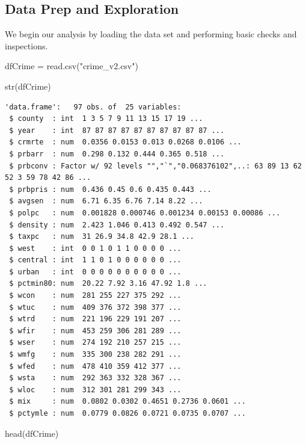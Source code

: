 \documentclass[]{article}
\newenvironment{Shaded}{}{}
\newcommand{\KeywordTok}[1]{\textcolor[rgb]{0.00,0.00,1.00}{#1}}
\newcommand{\NormalTok}[1]{#1}
\newcommand{\StringTok}[1]{\textcolor[rgb]{0.00,0.50,0.50}{#1}}
\begin{document}
\hypertarget{data-prep-and-exploration}{%
\subsection{Data Prep and Exploration}\label{data-prep-and-exploration}}

We begin our analysis by loading the data set and performing basic
checks and inspections.

\begin{Shaded}
\begin{Highlighting}[]
\NormalTok{dfCrime =}\StringTok{ }\KeywordTok{read.csv}\NormalTok{(}\StringTok{"crime_v2.csv"}\NormalTok{)}
\end{Highlighting}
\end{Shaded}

\begin{Shaded}
\begin{Highlighting}[]
\KeywordTok{str}\NormalTok{(dfCrime)}
\end{Highlighting}
\end{Shaded}

\begin{verbatim}
'data.frame':   97 obs. of  25 variables:
 $ county  : int  1 3 5 7 9 11 13 15 17 19 ...
 $ year    : int  87 87 87 87 87 87 87 87 87 87 ...
 $ crmrte  : num  0.0356 0.0153 0.013 0.0268 0.0106 ...
 $ prbarr  : num  0.298 0.132 0.444 0.365 0.518 ...
 $ prbconv : Factor w/ 92 levels "","`","0.068376102",..: 63 89 13 62 52 3 59 78 42 86 ...
 $ prbpris : num  0.436 0.45 0.6 0.435 0.443 ...
 $ avgsen  : num  6.71 6.35 6.76 7.14 8.22 ...
 $ polpc   : num  0.001828 0.000746 0.001234 0.00153 0.00086 ...
 $ density : num  2.423 1.046 0.413 0.492 0.547 ...
 $ taxpc   : num  31 26.9 34.8 42.9 28.1 ...
 $ west    : int  0 0 1 0 1 1 0 0 0 0 ...
 $ central : int  1 1 0 1 0 0 0 0 0 0 ...
 $ urban   : int  0 0 0 0 0 0 0 0 0 0 ...
 $ pctmin80: num  20.22 7.92 3.16 47.92 1.8 ...
 $ wcon    : num  281 255 227 375 292 ...
 $ wtuc    : num  409 376 372 398 377 ...
 $ wtrd    : num  221 196 229 191 207 ...
 $ wfir    : num  453 259 306 281 289 ...
 $ wser    : num  274 192 210 257 215 ...
 $ wmfg    : num  335 300 238 282 291 ...
 $ wfed    : num  478 410 359 412 377 ...
 $ wsta    : num  292 363 332 328 367 ...
 $ wloc    : num  312 301 281 299 343 ...
 $ mix     : num  0.0802 0.0302 0.4651 0.2736 0.0601 ...
 $ pctymle : num  0.0779 0.0826 0.0721 0.0735 0.0707 ...
\end{verbatim}

\begin{Shaded}
\begin{Highlighting}[]
\KeywordTok{head}\NormalTok{(dfCrime)}
\end{Highlighting}
\end{Shaded}
\end{document}
